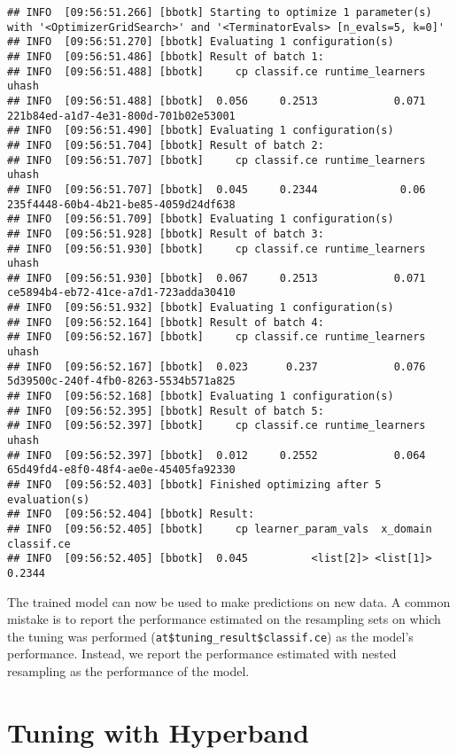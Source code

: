 \documentclass[
]{scrbook}
\begin{document}
\begin{verbatim}
## INFO  [09:56:51.266] [bbotk] Starting to optimize 1 parameter(s) with '<OptimizerGridSearch>' and '<TerminatorEvals> [n_evals=5, k=0]' 
## INFO  [09:56:51.270] [bbotk] Evaluating 1 configuration(s) 
## INFO  [09:56:51.486] [bbotk] Result of batch 1: 
## INFO  [09:56:51.488] [bbotk]     cp classif.ce runtime_learners                                uhash 
## INFO  [09:56:51.488] [bbotk]  0.056     0.2513            0.071 221b84ed-a1d7-4e31-800d-701b02e53001 
## INFO  [09:56:51.490] [bbotk] Evaluating 1 configuration(s) 
## INFO  [09:56:51.704] [bbotk] Result of batch 2: 
## INFO  [09:56:51.707] [bbotk]     cp classif.ce runtime_learners                                uhash 
## INFO  [09:56:51.707] [bbotk]  0.045     0.2344             0.06 235f4448-60b4-4b21-be85-4059d24df638 
## INFO  [09:56:51.709] [bbotk] Evaluating 1 configuration(s) 
## INFO  [09:56:51.928] [bbotk] Result of batch 3: 
## INFO  [09:56:51.930] [bbotk]     cp classif.ce runtime_learners                                uhash 
## INFO  [09:56:51.930] [bbotk]  0.067     0.2513            0.071 ce5894b4-eb72-41ce-a7d1-723adda30410 
## INFO  [09:56:51.932] [bbotk] Evaluating 1 configuration(s) 
## INFO  [09:56:52.164] [bbotk] Result of batch 4: 
## INFO  [09:56:52.167] [bbotk]     cp classif.ce runtime_learners                                uhash 
## INFO  [09:56:52.167] [bbotk]  0.023      0.237            0.076 5d39500c-240f-4fb0-8263-5534b571a825 
## INFO  [09:56:52.168] [bbotk] Evaluating 1 configuration(s) 
## INFO  [09:56:52.395] [bbotk] Result of batch 5: 
## INFO  [09:56:52.397] [bbotk]     cp classif.ce runtime_learners                                uhash 
## INFO  [09:56:52.397] [bbotk]  0.012     0.2552            0.064 65d49fd4-e8f0-48f4-ae0e-45405fa92330 
## INFO  [09:56:52.403] [bbotk] Finished optimizing after 5 evaluation(s) 
## INFO  [09:56:52.404] [bbotk] Result: 
## INFO  [09:56:52.405] [bbotk]     cp learner_param_vals  x_domain classif.ce 
## INFO  [09:56:52.405] [bbotk]  0.045          <list[2]> <list[1]>     0.2344
\end{verbatim}

The trained model can now be used to make predictions on new data.
A common mistake is to report the performance estimated on the resampling sets on which the tuning was performed (\texttt{at\$tuning\_result\$classif.ce}) as the model's performance.
Instead, we report the performance estimated with nested resampling as the performance of the model.

\hypertarget{hyperband}{%
\section{Tuning with Hyperband}\label{hyperband}}
\end{document}
